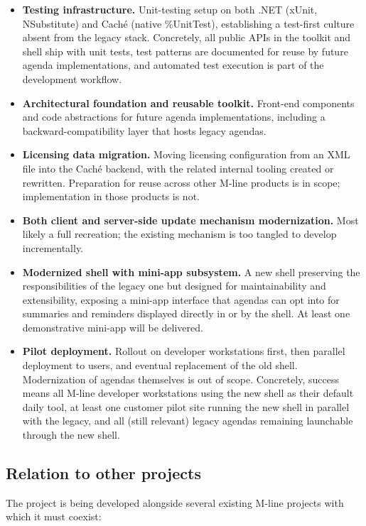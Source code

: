 \documentclass{article}
\begin{document}
\begin{itemize}
  \item \textbf{Testing infrastructure.} Unit-testing setup on both .NET (xUnit, NSubstitute) and Caché (native \%UnitTest), establishing a test-first culture absent from the legacy stack. Concretely, all public APIs in the toolkit and shell ship with unit tests, test patterns are documented for reuse by future agenda implementations, and automated test execution is part of the development workflow.
  \item \textbf{Architectural foundation and reusable toolkit.} Front-end components and code abstractions for future agenda implementations, including a backward-compatibility layer that hosts legacy agendas.
  \item \textbf{Licensing data migration.} Moving licensing configuration from an XML file into the Caché backend, with the related internal tooling created or rewritten. Preparation for reuse across other M-line products is in scope; implementation in those products is not.
  \item \textbf{Both client and server-side update mechanism modernization.} Most likely a full recreation; the existing mechanism is too tangled to develop incrementally.
  \item \textbf{Modernized shell with mini-app subsystem.} A new shell preserving the responsibilities of the legacy one but designed for maintainability and extensibility, exposing a mini-app interface that agendas can opt into for summaries and reminders displayed directly in or by the shell. At least one demonstrative mini-app will be delivered.
  \item \textbf{Pilot deployment.} Rollout on developer workstations first, then parallel deployment to users, and eventual replacement of the old shell. Modernization of agendas themselves is out of scope. Concretely, success means all M-line developer workstations using the new shell as their default daily tool, at least one customer pilot site running the new shell in parallel with the legacy, and all (still relevant) legacy agendas remaining launchable through the new shell.
\end{itemize}

\subsection{Relation to other projects}

The project is being developed alongside several existing M-line projects with which it must coexist:
\end{document}
